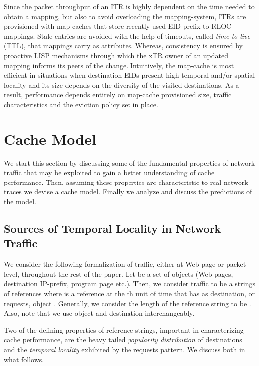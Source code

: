 \documentclass[twocolumn, 10pt]{article}
\theoremstyle{plain}
\begin{document}
Since the packet throughput of an ITR is highly dependent on the time needed
to obtain a mapping, but also to avoid overloading the mapping-system, ITRs
are provisioned with map-caches that store recently used EID-prefix-to-RLOC
mappings. Stale entries are avoided with the help of timeouts, called
\emph{time to live} (TTL), that mappings carry as attributes. Whereas,
consistency is ensured by proactive LISP mechanisms through which the xTR
owner of an updated mapping informs its peers of the change.  Intuitively, the
map-cache is most efficient in situations when destination EIDs present high
temporal and/or spatial locality and its size depends on the diversity of the
visited destinations. As a result, performance depends entirely on map-cache
provisioned size, traffic characteristics and the eviction policy set in
place. 



 
\section{Cache Model}\label{sec:cache_model}
We start this section by discussing some of the fundamental properties of network traffic
that may be exploited to gain a better understanding of cache performance. Then,
assuming these properties are characteristic to real network traces we devise a
cache model. Finally we analyze and discuss the predictions of the model. 

\subsection{Sources of Temporal Locality in Network Traffic}\label{sec:temp_locality}

We consider the following formalization of traffic, either at Web page or
packet level, throughout the rest of the paper. Let  be a set of objects
(Web pages, destination IP-prefix, program page etc.). Then, we consider 
traffic to be a strings of references  where
 is a reference at the th unit of time that 
has as destination, or requests, object . Generally, we consider the length
of the reference string to be . Also, note that we use object
and destination interchangeably. 

Two of the defining properties of reference strings, important in
characterizing cache performance, are the heavy tailed \emph{popularity
distribution} of destinations and the \emph{temporal locality} exhibited by
the requests pattern. We discuss both in what follows.  
\end{document}
